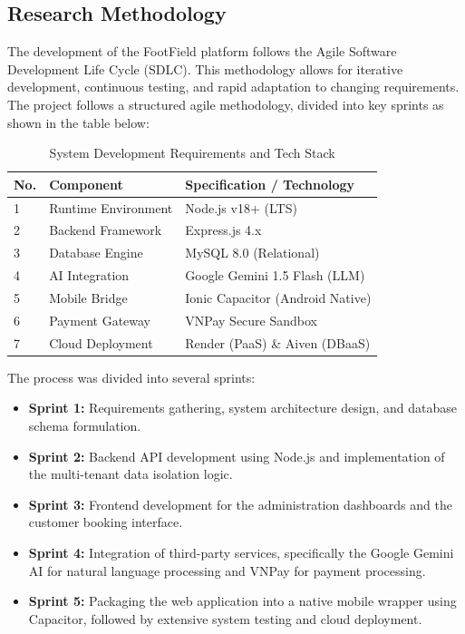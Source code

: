 \subsection{Research Methodology}
The development of the FootField platform follows the Agile Software Development Life Cycle (SDLC). This methodology allows for iterative development, continuous testing, and rapid adaptation to changing requirements. 
The project follows a structured agile methodology, divided into key sprints as shown in the table below:

\begin{table}[htbp]
\centering
\begin{tabular}{|l|l|l|}
\hline
\rowcolor{LightCyan}
\textbf{No.} & \textbf{Component} & \textbf{Specification / Technology} \\ \hline
1 & Runtime Environment & Node.js v18+ (LTS) \\ \hline
2 & Backend Framework & Express.js 4.x \\ \hline
3 & Database Engine & MySQL 8.0 (Relational) \\ \hline
4 & AI Integration & Google Gemini 1.5 Flash (LLM) \\ \hline
5 & Mobile Bridge & Ionic Capacitor (Android Native) \\ \hline
6 & Payment Gateway & VNPay Secure Sandbox \\ \hline
7 & Cloud Deployment & Render (PaaS) \& Aiven (DBaaS) \\ \hline
\end{tabular}
\caption{System Development Requirements and Tech Stack}
\label{tab:requirements}
\end{table}

The process was divided into several sprints:
\begin{itemize}
    \item \textbf{Sprint 1:} Requirements gathering, system architecture design, and database schema formulation.
    \item \textbf{Sprint 2:} Backend API development using Node.js and implementation of the multi-tenant data isolation logic.
    \item \textbf{Sprint 3:} Frontend development for the administration dashboards and the customer booking interface.
    \item \textbf{Sprint 4:} Integration of third-party services, specifically the Google Gemini AI for natural language processing and VNPay for payment processing.
    \item \textbf{Sprint 5:} Packaging the web application into a native mobile wrapper using Capacitor, followed by extensive system testing and cloud deployment.
\end{itemize}


